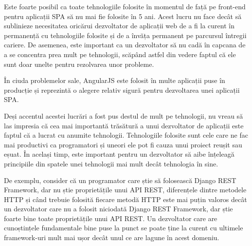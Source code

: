 Este foarte posibil ca toate tehnologiile folosite în momentul
de față pe front-end pentru aplicații SPA să nu mai fie folosite
în 5 ani. Acest lucru nu face decât să sublinieze necesitatea oricărui
dezvoltator de aplicații web de a fi la curent în permanență
cu tehnologiile folosite și de a învăța permanent pe parcursul
întregii cariere. De asemenea, este important ca un dezvoltator
să nu cadă în capcana de a se concentra prea mult pe tehnologii,
scăpând astfel din vedere faptul că ele sunt doar unelte
pentru rezolvarea unor probleme.

În ciuda problemelor sale, AngularJS este folosit în multe aplicații
puse în producție și reprezintă o alegere relativ sigură
pentru dezvoltarea unei aplicații SPA.

Deși accentul acestei lucrări a fost pus destul de mult pe
tehnologii, nu vreau să las impresia că cea mai importantă
trăsătură a unui dezvoltator de aplicații este faptul că
a lucrat cu anumite tehnologii. Tehnologiile folosite
sunt cele care ne fac mai productivi ca programatori
și uneori ele pot fi cauza unui proiect reușit sau eșuat.
În același timp, este important pentru un dezvoltator
să aibe înțeleagă principiile din spatele unei tehnologii
mai mult decât tehnologia în sine.

De exemplu, consider că un programator care știe
să folosească Django REST Framework, dar nu știe
proprietățile unui API REST, diferențele dintre 
metodele HTTP și când trebuie folosită fiecare
metodă HTTP este mai puțin valoros decât un
dezvoltator care nu a folosit niciodată
Django REST Framework, dar știe foarte
bine toate proprietățile unui API REST.
Un dezvoltator care are cunoștințele fundamentale
bine puse la punct se poate ține la curent
cu ultimele framework-uri mult mai ușor
decât unul ce are lagune în acest domeniu.